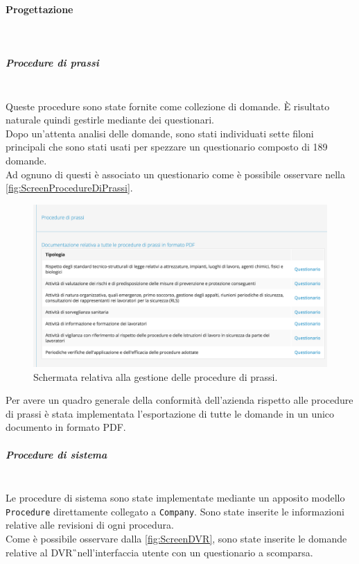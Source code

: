 	\paragraph*{Progettazione}\mbox{}\\
		\subparagraph*{Procedure di prassi}\mbox{}\\
		Queste procedure sono state fornite come collezione di domande. È risultato naturale quindi gestirle mediante dei questionari.\\
		Dopo un'attenta analisi delle domande, sono stati individuati sette filoni principali che sono stati usati per spezzare un questionario composto di 189 domande.\\
		Ad ognuno di questi è associato un questionario come è possibile osservare nella \autoref{fig:ScreenProcedureDiPrassi}.
		
		\begin{figure}[H]
			\begin{center}
				\includegraphics[width=14cm]{Pics/ScreenProcedureDiPrassi.png}
				\caption{Schermata relativa alla gestione delle procedure di prassi.}
				\label{fig:ScreenProcedureDiPrassi}
			\end{center}
		\end{figure}
		Per avere un quadro generale della conformità dell'azienda rispetto alle procedure di prassi è stata implementata l'esportazione di tutte le domande in un unico documento in formato PDF.
		
		\subparagraph*{Procedure di sistema}\mbox{}\\
			
			Le procedure di sistema sono state implementate mediante un apposito modello \texttt{Procedure} direttamente collegato a \texttt{Company}. Sono state inserite le informazioni relative alle revisioni di ogni procedura.\\
			Come è possibile osservare dalla \autoref{fig:ScreenDVR}, sono state inserite le domande relative al \gls{DVR}\G\ nell'interfaccia utente con un questionario a scomparsa.
			
